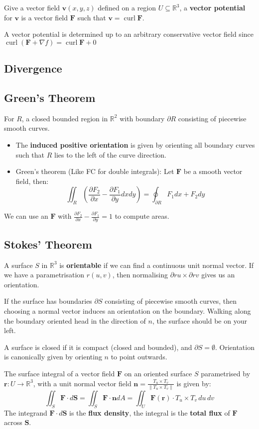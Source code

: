 \documentclass[a4paper]{article}
\newcommand{\RR}{\mathbb{R}}
\def\pp#1#2{\frac{\partial #1}{\partial #2}}
\def\curl{\operatorname{curl}}
\begin{document}
\begin{multicols}{2}
	Give a vector field $\mathbf{v}(x,y,z)$ defined on a region $U\subseteq\RR^3$, a \textbf{vector potential} for $\mathbf{v}$ is a vector field $\mathbf{F}$ such that $\mathbf{v}=\curl \mathbf{F}$.

	A vector potential is determined up to an arbitrary conservative vector field since $\curl(\mathbf{F}+\nabla f)=\curl \mathbf{F} +0$

	\subsection*{Divergence}

	\subsection*{Green's Theorem}
	For $R$, a closed bounded region in $\RR^2$ with boundary $\partial R$ consisting of piecewise smooth curves.
	\begin{itemize}
		\item 	The \textbf{induced positive orientation} is given by orienting all boundary curves such that $R$ lies to the left of the curve direction.
		\item Green's theorem (Like FC for double integrals): Let $\mathbf{F}$ be a smooth vector field, then:
		      $$\iint_R\left( \pp{F_2}x - \pp{F_1}{y}dxdy \right)=\oint_{\partial R}F_1dx +F_2dy$$
	\end{itemize}
	We can use an $\mathbf{F}$ with $\pp{F_2}x - \pp{F_1}{y}=1$ to compute areas.

	\subsection*{Stokes' Theorem}

	A surface $S$ in $\RR^3$ is \textbf{orientable} if we can find a continuous unit normal vector. If we have a parametrisation $r(u,v)$, then normalising $\partial{r}u\times\partial{r}v$ gives us an orientation.

	If the surface has boundaries $\partial S$ consisting of piecewise smooth curves, then choosing a normal vector induces an orientation on the boundary. Walking along the boundary oriented head in the direction of $n$, the surface should be on your left.

	A surface is closed if it is compact (closed and bounded), and $\partial S=\emptyset$. Orientation is canonically given by orienting $n$ to point outwards.

	The surface integral of a vector field $\mathbf{F}$ on an oriented surface $S$ parametrised by $\mathbf{r}:U\to\RR^3$, with a unit normal vector field $\mathbf{n}=\frac{T_u\times T_v}{\|T_u\times T_v\|}$ is given by:
	\[
		\iint_S \mathbf{F}\cdot d\mathbf{S}=
		\iint_S \mathbf{F}\cdot \mathbf{n}dA=
		\iint_U \mathbf{F}(\mathbf{r})\cdot T_u\times T_v \,du\,dv
	\]
	The integrand $\mathbf{F}\cdot d\mathbf{S}$ is the \textbf{flux density}, the integral is the
	\textbf{total flux} of $\mathbf{F}$ across $\mathbf{S}$.


\end{multicols}
\end{document}
